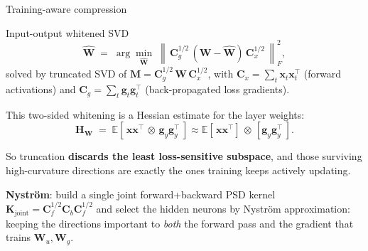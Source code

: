 \documentclass[9pt]{beamer}
\newcommand{\mat}[1]{\mathbf{#1}}
\newcommand{\norm}[1]{\left\lVert#1\right\rVert}
\begin{document}
	\begin{frame}{Training-aware compression}
		
		Input-output whitened SVD
		\[
		\hat{\mat{W}}
		\;=\;
		\arg\min_{\hat{\mat{W}}}\;
		\norm{\,\mat{C}_g^{1/2}\,(\mat{W}-\hat{\mat{W}})\,\mat{C}_x^{1/2}\,}_F^2 ,
		\]
		solved by truncated SVD of $\mat{M}=\mat{C}_g^{1/2}\,\mat{W}\,\mat{C}_x^{1/2}$,
		with $\mat{C}_x=\sum_t\mat{x}_t\mat{x}_t^{\!\top}$ (forward activations) and
		$\mat{C}_g=\sum_t\mat{g}_t\mat{g}_t^{\!\top}$ (back-propagated loss gradients).
		
		\vspace{0.8em}
		This two-sided whitening is a Hessian estimate for the layer weights:
		\[
		\mat{H}_{\mat{W}} \;=\; \mathbb{E}\!\left[\,\mat{x}\mat{x}^{\!\top}
		\,\otimes\, \mat{g}_y\mat{g}_y^{\!\top}\,\right]
		\approx \mathbb{E}\!\left[\,\mat{x}\mat{x}^{\!\top}\right]
		\,\otimes\, \left[\mat{g}_y\mat{g}_y^{\!\top}\,\right].
		\]
		
		\vspace{0.4em}
		So truncation \textbf{discards the least loss-sensitive subspace}, and those
		surviving high-curvature directions are exactly the ones training keeps
		actively updating.
		
		\textbf{Nystr\"om}: build a single joint forward+backward PSD kernel
		$\mat{K}_{\text{joint}}=\mat{C}_f^{1/2}\mat{C}_b\mat{C}_f^{1/2}$ and select the
		hidden neurons by Nystr\"om approximation: keeping the directions important to
		\emph{both} the forward pass and the gradient that trains $\mat{W}_u,\mat{W}_g$.
		
	\end{frame}
\end{document}
